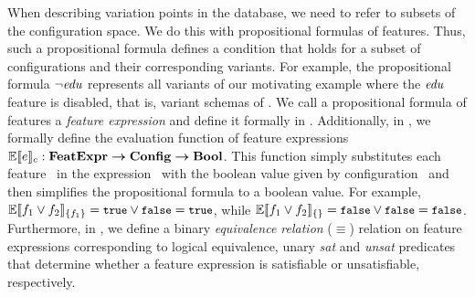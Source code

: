 When describing variation points in the database, we need to 
refer to subsets of the configuration space. We do this with
propositional formulas of features.
Thus, 
such a propositional formula defines a condition that holds for 
a subset of configurations and their corresponding variants. 
%
%
For example, the propositional formula $\neg \edu$ represents all variants of
our motivating example where the $\edu$ feature is disabled, that is, variant
schemas of . 
%
We call a propositional formula of features a \emph{feature expression} and define
it formally in . 
Additionally, in , we formally define the evaluation function of feature expressions
$\fSem \dimMeta : \ffSet \totype \confSet \totype \bSet$. This function simply substitutes each
feature \fName\ in the expression \dimMeta\ with the boolean value 
given by configuration \config\ and then
simplifies the propositional formula to a boolean value.
For example, 
$\fSem [\{\A\}] {\A \vee \B} = \t \vee \f = \t$, while
$\fSem [\{\}] {\A \vee \B} = \f \vee \f = \f$.
Furthermore, in , we define a binary \emph{equivalence
relation} ($\equiv$) relation on feature expressions corresponding to logical
equivalence, unary \emph{sat} and \emph{unsat} predicates that determine
whether a feature expression is satisfiable or unsatisfiable, respectively.
